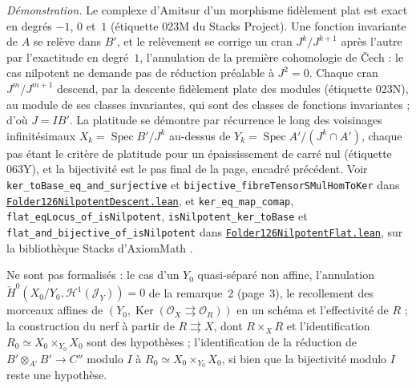 {\small \emph{Démonstration.} Le complexe d'Amitsur d'un morphisme fidèlement plat est exact en degrés $-1$, $0$ et~$1$ (étiquette 023M du Stacks Project). Une fonction invariante de $A$ se relève dans $B'$, et le relèvement se corrige un cran $J^k/J^{k+1}$ après l'autre par l'exactitude en degré~$1$, l'annulation de la première cohomologie de Čech : le cas nilpotent ne demande pas de réduction préalable à $J^2 = 0$. Chaque cran $J^m/J^{m+1}$ descend, par la descente fidèlement plate des modules (étiquette 023N), au module de ses classes invariantes, qui sont des classes de fonctions invariantes ; d'où $J = IB'$. La platitude se démontre par récurrence le long des voisinages infinitésimaux $X_k = \operatorname{Spec} B'/J^k$ au-dessus de $Y_k = \operatorname{Spec} A'/(J^k \cap A')$, chaque pas étant le critère de platitude pour un épaississement de carré nul (étiquette 063Y), et la bijectivité est le pas final de la page, encadré précédent. Voir \texttt{ker\_toBase\_eq\_and\_surjective} et \texttt{bijective\_fibreTensorSMulHomToKer} dans \href{\leanblobmain/AlgebraicGeometry/Folder126NilpotentDescent.lean}{\texttt{Folder126NilpotentDescent.\allowbreak{}lean}}, et \texttt{ker\_eq\_map\_comap}, \texttt{flat\_eqLocus\_of\_isNilpotent}, \texttt{isNilpotent\_ker\_toBase} et \texttt{flat\_and\_bijective\_of\_isNilpotent} dans \href{\leanblobmain/AlgebraicGeometry/Folder126NilpotentFlat.lean}{\texttt{Folder126NilpotentFlat.\allowbreak{}lean}}, sur la bibliothèque Stacks d'AxiomMath \cite{axiomstacks}.

Ne sont pas formalisés : le cas d'un $Y_0$ quasi-séparé non affine, l'annulation $\check H^0(X_0/Y_0, \mathcal H^1(\mathcal J_Y)) = 0$ de la remarque~2 (page~3), le recollement des morceaux affines de $(Y_0, \operatorname{Ker}(\mathcal O_X \rightrightarrows \mathcal O_R))$ en un schéma et l'effectivité de $R$ ; la construction du nerf à partir de $R \rightrightarrows X$, dont $R \times_X R$ et l'identification $R_0 \simeq X_0 \times_{Y_0} X_0$ sont des hypothèses ; l'identification de la réduction de $B' \otimes_{A'} B' \to C''$ modulo $I$ à $R_0 \simeq X_0 \times_{Y_0} X_0$, si bien que la bijectivité modulo $I$ reste une hypothèse.\par}

